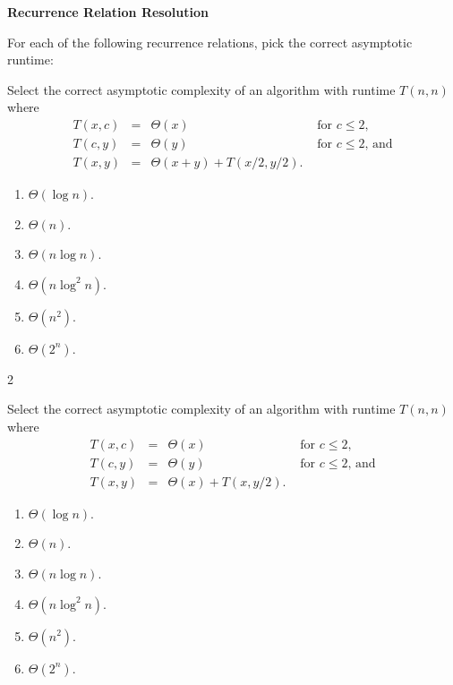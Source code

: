 \documentclass[12pt,twoside]{article}
\begin{document}
\begin{problems}
\begin{problemparts}
\end{problemparts}

\problem {} \textbf{Recurrence Relation Resolution}

For each of the following recurrence relations,
pick the correct asymptotic runtime:

\begin{problemparts}

\problempart {}
Select the correct asymptotic complexity
of an algorithm with runtime $T(n, n)$
where 
$$
\begin{array}{rcll}
T(x, c) &=& \Theta(x) & \textrm{ for $c \le 2$}, \\
T(c, y) &=& \Theta(y) & \textrm{ for $c \le 2$, and} \\
T(x, y) &=& \Theta(x + y) + T(x / 2, y / 2).
\end{array}
$$

\begin{enumerate}
\item $\Theta(\log n)$.
\item $\Theta(n)$.
\item $\Theta(n \log n)$.
\item $\Theta(n \log^2 n)$.
\item $\Theta(n^2)$.
\item $\Theta(2^n)$.
\end{enumerate}

\ifsolution \solution{}
2
\fi

\problempart {}
Select the correct asymptotic complexity
of an algorithm with runtime $T(n, n)$
where 
$$
\begin{array}{rcll}
T(x, c) &=& \Theta(x) & \textrm{ for $c \le 2$}, \\
T(c, y) &=& \Theta(y) & \textrm{ for $c \le 2$, and} \\
T(x, y) &=& \Theta(x) + T(x, y / 2).
\end{array}
$$

\begin{enumerate}
\item $\Theta(\log n)$.
\item $\Theta(n)$.
\item $\Theta(n \log n)$.
\item $\Theta(n \log^2 n)$.
\item $\Theta(n^2)$.
\item $\Theta(2^n)$.
\end{enumerate}


\end{problemparts}
\end{problems}
\end{document}
